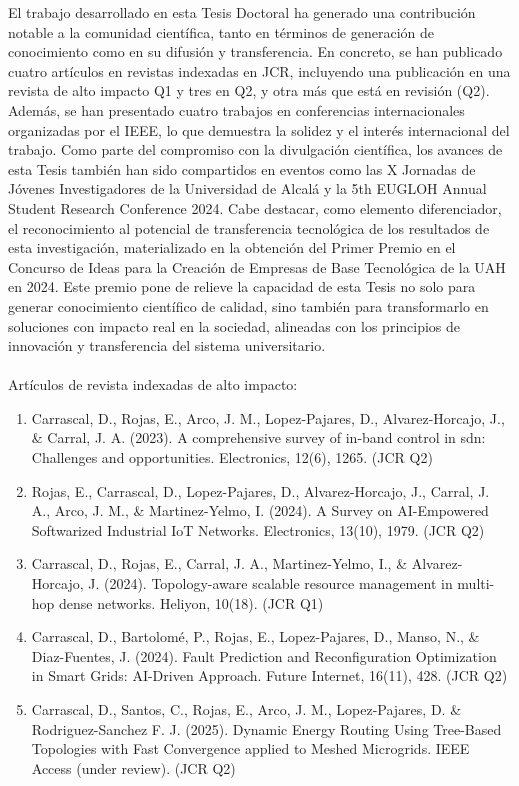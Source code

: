 El trabajo desarrollado en esta Tesis Doctoral ha generado una contribución notable a la comunidad científica, tanto en términos de generación de conocimiento como en su difusión y transferencia. En concreto, se han publicado cuatro artículos en revistas indexadas en JCR, incluyendo una publicación en una revista de alto impacto Q1 y tres en Q2, y otra más que está en revisión (Q2). Además, se han presentado cuatro trabajos en conferencias internacionales organizadas por el IEEE, lo que demuestra la solidez y el interés internacional del trabajo. Como parte del compromiso con la divulgación científica, los avances de esta Tesis también han sido compartidos en eventos como las X Jornadas de Jóvenes Investigadores de la Universidad de Alcalá y la 5th EUGLOH Annual Student Research Conference 2024. Cabe destacar, como elemento diferenciador, el reconocimiento al potencial de transferencia tecnológica de los resultados de esta investigación, materializado en la obtención del Primer Premio en el Concurso de Ideas para la Creación de Empresas de Base Tecnológica de la UAH en 2024. Este premio pone de relieve la capacidad de esta Tesis no solo para generar conocimiento científico de calidad, sino también para transformarlo en soluciones con impacto real en la sociedad, alineadas con los principios de innovación y transferencia del sistema universitario.\\
\\
Artículos de revista indexadas de alto impacto:

\begin{enumerate}
    \item Carrascal, D., Rojas, E., Arco, J. M., Lopez-Pajares, D., Alvarez-Horcajo, J., \& Carral, J. A. (2023). A comprehensive survey of in-band control in sdn: Challenges and opportunities. Electronics, 12(6), 1265. (JCR Q2)
    
    \item Rojas, E., Carrascal, D., Lopez-Pajares, D., Alvarez-Horcajo, J., Carral, J. A., Arco, J. M., \& Martinez-Yelmo, I. (2024). A Survey on AI-Empowered Softwarized Industrial IoT Networks. Electronics, 13(10), 1979. (JCR Q2)
    
    \item Carrascal, D., Rojas, E., Carral, J. A., Martinez-Yelmo, I., \& Alvarez-Horcajo, J. (2024). Topology-aware scalable resource management in multi-hop dense networks. Heliyon, 10(18). (JCR Q1)
    
    \item Carrascal, D., Bartolomé, P., Rojas, E., Lopez-Pajares, D., Manso, N., \& Diaz-Fuentes, J. (2024). Fault Prediction and Reconfiguration Optimization in Smart Grids: AI-Driven Approach. Future Internet, 16(11), 428. (JCR Q2)
    
    \item Carrascal, D., Santos, C., Rojas, E., Arco, J. M., Lopez-Pajares, D. \& Rodriguez-Sanchez F. J. (2025). Dynamic Energy Routing Using Tree-Based Topologies with Fast Convergence applied to Meshed Microgrids. IEEE Access (under review). (JCR Q2)
  
\end{enumerate}

